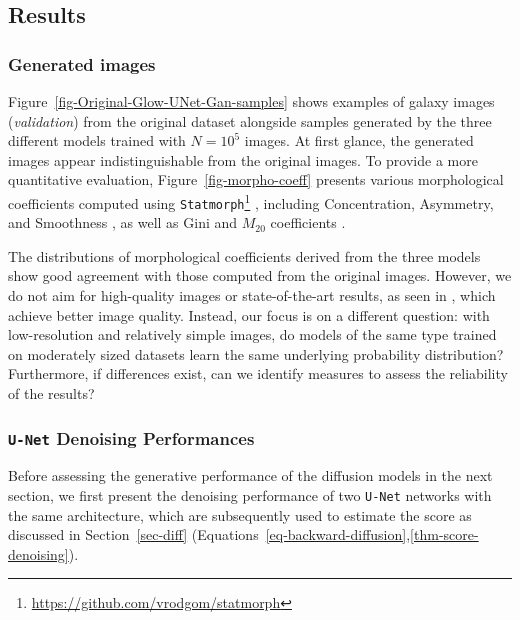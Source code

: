 \documentclass[fleqn,usenatbib]{mnras}
\begin{document}
%
\subsection{Results}
\label{sec-Results}
%
\subsubsection{Generated images}
\label{sec-Generated-Images}
%
Figure~\ref{fig-Original-Glow-UNet-Gan-samples} shows examples of galaxy images (\textit{validation}) from the original dataset alongside samples generated by the three different models trained with $N = 10^5$ images.
%
%
At first glance, the generated images appear indistinguishable from the original images. To provide a more quantitative evaluation, Figure~\ref{fig-morpho-coeff} presents various morphological coefficients computed using \texttt{Statmorph}\footnote{\url{https://github.com/vrodgom/statmorph}} \citep{2019MNRAS.483.4140R}, including Concentration, Asymmetry, and Smoothness \citep{2000AJ....119.2645B,2003ApJS..147....1C,2004AJ....128..163L}, as well as Gini and $M_{20}$ coefficients \citep{2004AJ....128..163L,10.1093/mnras/stv2078}.



The distributions of morphological coefficients derived from the three models show good agreement with those computed from the original images. However, we do not aim for high-quality images or state-of-the-art results, as seen in \citep{ravanbakhsh2016, Fussell2019, Lanusse2021, smith2021, HACKSTEIN2023100685}, which achieve better image quality. Instead, our focus is on a different question: with low-resolution and relatively simple images, do models of the same type trained on moderately sized datasets learn the same underlying probability distribution? Furthermore, if differences exist, can we identify measures to assess the reliability of the results?
%
\subsubsection{\texttt{U-Net} Denoising Performances}
\label{sec-UNet-Perf}
%
{\color{red} Before assessing the generative performance of the diffusion models in the next section, we first present the denoising performance of two \texttt{U-Net} networks with the same architecture, which are subsequently used to estimate the score as discussed in Section~\ref{sec-diff} (Equations~\ref{eq-backward-diffusion},\ref{thm-score-denoising}).
}
\end{document}
